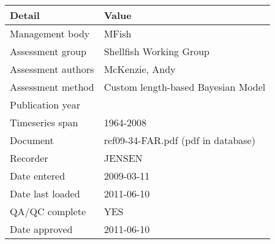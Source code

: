 \begin{table}[htb]
\centering
\begin{tabular}{lp{7cm}}
\toprule
Detail & Value \\
\midrule
Management body    & MFish                              \\
Assessment group   & Shellfish Working Group            \\
Assessment authors & McKenzie, Andy                     \\
Assessment method  & Custom length-based Bayesian Model \\
Publication year   &                                    \\
Timeseries span    & 1964-2008                          \\
Document           & ref09-34-FAR.pdf (pdf in database) \\
Recorder           & JENSEN                             \\
Date entered       & 2009-03-11                         \\
Date last loaded   & 2011-06-10                         \\
QA/QC complete     & YES                                \\
Date approved      & 2011-06-10                         \\
\bottomrule
\end{tabular}
\label{tab:assessdet}
\end{table}
